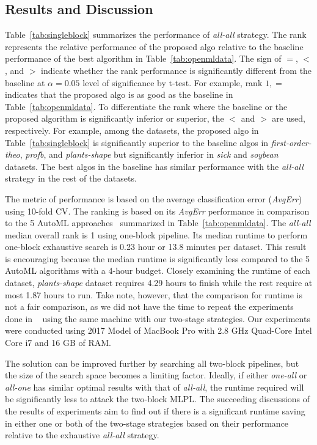 \documentclass{juliacon}
\begin{document}
\subsection{Results and Discussion}



Table~\ref{tab:singleblock} summarizes the performance of \emph{all-all}
strategy. The rank represents the relative performance of the proposed algo
relative to the baseline performance of the best algorithm in Table~\ref{tab:openmldata}.
The sign of $=$, $<$, and $>$ indicate whether the rank performance is significantly different
from the baseline at $\alpha=0.05$ level of significance by t-test. 
For example, rank $1, =$ indicates that the proposed algo is as good as
the baseline in Table~\ref{tab:openmldata}. To differentiate the rank where the baseline
or the proposed algorithm is significantly inferior or superior, the $<$ and $>$ are used, 
respectively. For example,  among the datasets, the proposed algo in Table~\ref{tab:singleblock}
is significantly superior to the baseline algos in \emph{first-order-theo}, \emph{profb}, and \emph{plants-shape}
but significantly inferior in \emph{sick} and \emph{soybean} datasets. The best algos in the baseline
has similar performance with the \emph{all-all} strategy in the rest of the datasets.

\vskip 6pt

The metric of performance is based on the average classification
error (\emph{AvgErr}) using 10-fold CV. The ranking is based on its
\emph{AvgErr} performance in comparison to the 
5 AutoML approaches~\cite{zoller2019} summarized in Table~\ref{tab:openmldata}.
The \emph{all-all} median overall rank is 1 using one-block pipeline.
Its median runtime to perform one-block exhaustive search is 0.23 hour or 13.8 minutes per dataset.
This result is encouraging because the median runtime is significantly less
compared to the 5 AutoML algorithms with a 4-hour budget.  Closely examining 
the runtime of each dataset, \emph{plants-shape} dataset
requires 4.29 hours to finish while
the rest require at most 1.87 hours to run. Take note, however, that the
comparison for runtime is not a fair comparison, as we did not have the time to repeat the experiments done in ~\cite{zoller2019}
using the same machine with our two-stage strategies. Our experiments were conducted using 2017 Model of MacBook Pro with 2.8 GHz Quad-Core Intel Core i7 and 16 GB of RAM.

\vskip 6pt

The solution can be improved further by searching all two-block pipelines,
but the size of the search space becomes a limiting factor. Ideally, if either
\emph{one-all} or \emph{all-one} has similar optimal results with that of
\emph{all-all}, the runtime required will be significantly less to attack
the two-block MLPL.  The succeeding discussions of the results of
experiments aim to find out if there is a significant runtime
saving in either one or both of the two-stage strategies based
on their performance relative to the exhaustive \emph{all-all}
strategy.
\end{document}
